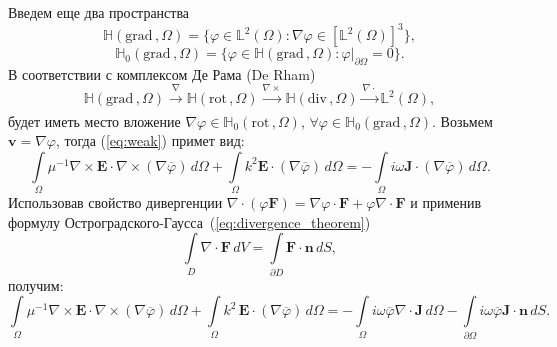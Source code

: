 \documentclass[a4paper,12pt]{article}
\begin{document}
Введем еще два пространства~\citep{monk}
\begin{equation*}
	\mathbb{H}( \mathrm{grad}\,, \Omega ) = \lbrace \varphi \in \mathbb{L}^{2}(\Omega) : \nabla \varphi \in [ \mathbb{L}^{2}(\Omega) ]^{3} \rbrace , \label{eq:H_grad}
\end{equation*}
\begin{equation*}
	\mathbb{H}_{0}( \mathrm{grad}\,, \Omega ) = \lbrace \varphi \in \mathbb{H}( \mathrm{grad}\,, \Omega ) : \left. \varphi \right | _{\partial \Omega} = 0 \rbrace . \label{eq:H0_grad}
\end{equation*}
В соответствии с комплексом Де Рама (De Rham)~\citep{schwarzbach}
\begin{equation}
	\mathbb{H}( \mathrm{grad}\,, \Omega ) \xrightarrow[]{\nabla} \mathbb{H}( \mathrm{rot}\,, \Omega ) \xrightarrow[]{\nabla \times} \mathbb{H}( \mathrm{div}\,, \Omega ) \xrightarrow[]{\nabla \cdot} \mathbb{L}^{2}(\Omega) , \label{eq:derham}
\end{equation}
будет иметь место вложение $\nabla \varphi \in \mathbb{H}_{0}( \mathrm{rot}\,, \Omega )$, $\forall \varphi \in \mathbb{H}_{0}( \mathrm{grad}\,, \Omega )$. Возьмем $\mathbf{v} = \nabla \varphi$, тогда (\ref{eq:weak}) примет вид:
\begin{equation*}
	\int\limits_\Omega \mu^{-1} \nabla \times \mathbf{E} \cdot \nabla \times (\nabla \overline{\varphi}) \,d\Omega + \int\limits_\Omega k^{2} \mathbf{E} \cdot (\nabla \overline{\varphi}) \,d\Omega = - \int\limits_\Omega i \omega \mathbf{J} \cdot (\nabla \overline{\varphi}) \,d\Omega .
\end{equation*}
Использовав свойство дивергенции $\nabla \cdot (\varphi \mathbf{F}) = \nabla \varphi \cdot \mathbf{F} + \varphi \nabla \cdot \mathbf{F}$ и применив формулу Ос\-т\-ро\-г\-ра\-д\-с\-ко\-го-Гаусса~(\ref{eq:divergence_theorem})
\begin{equation}
	\int\limits_{D} \nabla \cdot \mathbf{F} \,dV = \int\limits_{\partial D} \mathbf{F} \cdot \mathbf{n} \,dS ,
	\label{eq:divergence_theorem}
\end{equation}
получим:
\begin{equation*}
	\int\limits_\Omega \mu^{-1} \nabla \times \mathbf{E} \cdot \nabla \times (\nabla \overline{\varphi}) \,d\Omega + \int\limits_\Omega k^{2}\, \mathbf{E} \cdot (\nabla \overline{\varphi}) \,d\Omega = - \int\limits_\Omega i \omega \overline{\varphi} \nabla \cdot \mathbf{J} \,d\Omega - \int\limits_{\partial \Omega} i \omega \overline{\varphi} \mathbf{J} \cdot \mathbf{n} \,d S .
\end{equation*}
\end{document}
